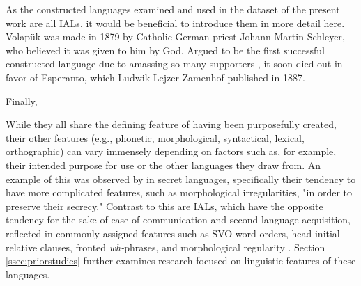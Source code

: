 \documentclass[12pt,a4paper]{article}
\numberwithin{figure}{section}
\numberwithin{table}{section}
\numberwithin{definition}{section}
\begin{document}

As the constructed languages examined and used in the dataset of the present work are all IALs, it would be beneficial to introduce them in more detail here. Volapük was made in 1879 by Catholic German priest Johann Martin Schleyer, who believed it was given to him by God. Argued to be the first successful constructed language due to amassing so many supporters \parencite{Gobbo2016article}, it soon died out in favor of Esperanto, which Ludwik Lejzer Zamenhof published in 1887.

Finally, 

While they all share the defining feature of having been purposefully created, their other features (e.g., phonetic, morphological, syntactical, lexical, orthographic) can vary immensely depending on factors such as, for example, their intended purpose for use or the other languages they draw from. An example of this was observed by \textcite{Gobbo2016article} in secret languages, specifically their tendency to have more complicated features, such as morphological irregularities, "in order to preserve their secrecy." Contrast to this are IALs, which have the opposite tendency for the sake of ease of communication and second-language acquisition, reflected in commonly assigned features such as SVO word orders, head-initial relative clauses, fronted \textit{wh-}phrases, and morphological regularity \parencite{goodall2022article,Gobbo2016article}. Section \ref{ssec:priorstudies} further examines research focused on linguistic features of these languages. 
\end{document}
